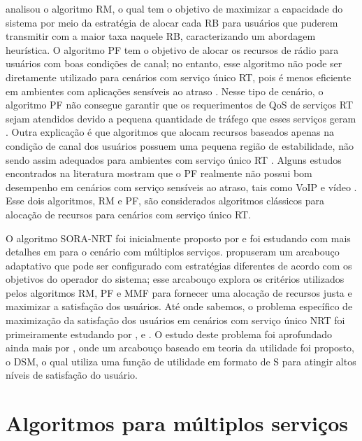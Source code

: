  analisou o algoritmo \ac{RM}, o qual tem o objetivo de maximizar a capacidade do sistema por meio da estratégia de alocar cada \acs{RB} para usuários que puderem transmitir com a maior taxa naquele RB, caracterizando um abordagem heurística. O algoritmo \ac{PF} tem o objetivo de alocar os recursos de rádio para usuários com boas condições de canal; no entanto, esse algoritmo não pode ser diretamente utilizado para cenários com serviço único RT, pois é menos eficiente em ambientes com aplicações sensíveis ao atraso \cite{kwan2009proportional, song2004joint,Proc:Ryu2005}. Nesse tipo de cenário, o algoritmo PF não consegue garantir que os requerimentos de QoS de serviços RT sejam atendidos devido a pequena quantidade de tráfego que esses serviços geram \cite{Proc:Lei2007}. Outra explicação é que algoritmos que alocam recursos baseados apenas na condição de canal dos usuários possuem uma pequena região de estabilidade, não sendo assim adequados para ambientes com serviço único RT \cite{Art:Song2005_Commag}. Alguns estudos encontrados na literatura mostram que o PF realmente não possui bom desempenho em cenários com serviço sensíveis ao atraso, tais como VoIP e vídeo \cite{Ali2012, basukala2009performance, capozzi2013downlink}.
Esse dois algoritmos, RM e PF, são considerados algoritmos clássicos para alocação de recursos para cenários com serviço único RT. 

O algoritmo \ac{SORA-NRT} foi inicialmente proposto por  e foi estudando com mais detalhes em  para o cenário com múltiplos serviços. 
 propuseram um arcabouço adaptativo que pode ser configurado com estratégias diferentes de acordo com os objetivos do operador do sistema; esse arcabouço explora os critérios utilizados pelos algoritmos \ac{RM}, \ac{PF} e \ac{MMF} para fornecer uma alocação de recursos justa e maximizar a satisfação dos usuários. Até onde sabemos, o problema específico de maximização da satisfação dos usuários em cenários com serviço único NRT foi primeiramente estudando por ,  e . O estudo deste problema foi aprofundado ainda mais por , onde um arcabouço baseado em teoria da utilidade foi proposto, o \ac{DSM}, o qual utiliza uma função de utilidade em formato de S para atingir altos níveis de satisfação do usuário.

\section{Algoritmos para múltiplos serviços}

